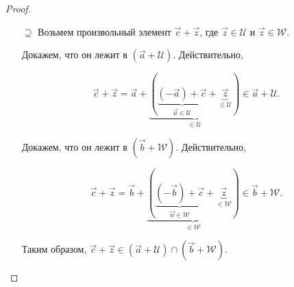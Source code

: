 \begin{proof}
\begin{enumerate}
        \item[$\supseteq$] Возьмем произвольный элемент $\vec{c} + \vec{z}$, где $\vec{z} \in \mathcal{U}$ и $\vec{z} \in \mathcal{W}$.

        Докажем, что он лежит в $(\vec{a} + \mathcal{U})$. Действительно, 
    
        $$\vec{c} + \vec{z} = \vec{a} + \underbrace{(\underbrace{(-\vec{a}) + \vec{c}}_{\vec{u} \in \mathcal{U}} + \underbrace{\vec{z}}_{\in \mathcal{U}})}_{\in \mathcal{U}} \in \vec{a} + \mathcal{U.}$$
    
        Докажем, что он лежит в $(\vec{b} + \mathcal{W})$. Действительно, 
    
        $$\vec{c} + \vec{z} = \vec{b} + \underbrace{(\underbrace{(-\vec{b}) + \vec{c}}_{\vec{w} \in \mathcal{W}} + \underbrace{\vec{z}}_{\in \mathcal{W}})}_{\in \mathcal{W}} \in \vec{b} + \mathcal{W.}$$
    
        Таким образом, $\vec{c} + \vec{z} \in (\vec{a} + \mathcal{U}) \cap (\vec{b} + \mathcal{W})$.
    \end{enumerate}
\end{proof}
